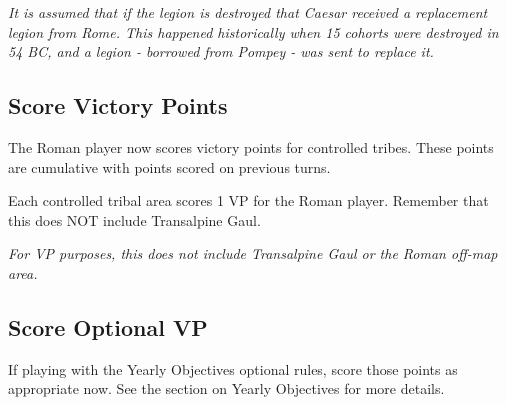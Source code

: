 \textit{It is assumed that if the legion is destroyed that Caesar received a replacement legion from Rome. This happened historically when 15 cohorts were destroyed in 54 BC, and a legion - borrowed from Pompey - was sent to replace it.}

\subsection{Score Victory Points}
\par
The Roman player now scores victory points for controlled tribes. These points are cumulative with points scored on previous turns.

Each controlled tribal area scores 1 VP for the Roman player. Remember that this does NOT include Transalpine Gaul.

\textit{For VP purposes, this does not include Transalpine Gaul or the Roman off-map area.}

\subsection{Score Optional VP}
If playing with the Yearly Objectives optional rules, score those points as appropriate now. See the section on Yearly Objectives for more details.
